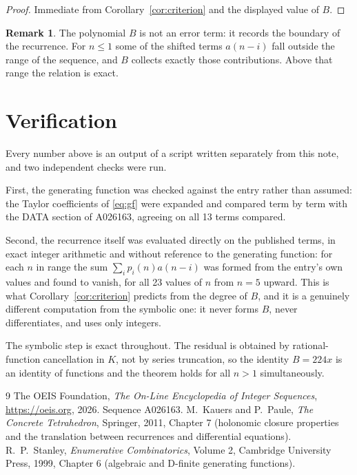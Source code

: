 \documentclass[11pt,a4paper]{article}
\theoremstyle{plain}
\theoremstyle{definition}
\newtheorem{remark}[theorem]{Remark}
\begin{document}
\begin{proof}
Immediate from Corollary~\ref{cor:criterion} and the displayed value of $B$.
\end{proof}

\begin{remark}
The polynomial $B$ is not an error term: it records the boundary of the recurrence. For
$n\le1$ some of the shifted terms $a(n-i)$ fall outside the range of the sequence,
and $B$ collects exactly those contributions. Above that range the relation is exact.
\end{remark}

\section{Verification}

Every number above is an output of a script written separately from this note, and two
independent checks were run.

First, the generating function was checked against the entry rather than assumed: the
Taylor coefficients of \eqref{eq:gf} were expanded and compared term by term with the DATA
section of A026163, agreeing on all 13 terms compared.

Second, the recurrence itself was evaluated directly on the published terms, in exact
integer arithmetic and without reference to the generating function: for each $n$ in range
the sum $\sum_{i}p_{i}(n)a(n-i)$ was formed from the entry's own values and found to
vanish, for all 23 values of $n$ from $n=5$ upward. This is what
Corollary~\ref{cor:criterion} predicts from the degree of $B$, and it is a genuinely
different computation from the symbolic one: it never forms $B$, never differentiates, and
uses only integers.

The symbolic step is exact throughout. The residual is obtained by rational-function
cancellation in $K$, not by series truncation, so the identity $B=224 x$ is an
identity of functions and the theorem holds for all $n>1$ simultaneously.

\begin{thebibliography}{9}
 The OEIS Foundation, \emph{The On-Line Encyclopedia of Integer Sequences},
\url{https://oeis.org}, 2026. Sequence A026163.
 M.~Kauers and P.~Paule, \emph{The Concrete Tetrahedron}, Springer, 2011,
Chapter 7 (holonomic closure properties and the translation between recurrences and
differential equations).
 R.~P.~Stanley, \emph{Enumerative Combinatorics}, Volume 2, Cambridge
University Press, 1999, Chapter 6 (algebraic and D-finite generating functions).
\end{thebibliography}
\end{document}
